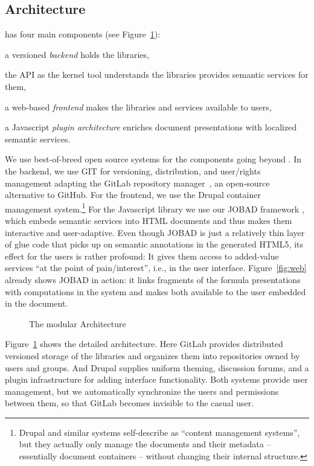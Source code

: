 \subsection{Architecture}\label{sec:mathhub:arch}
\mathhub has four main components (see Figure~\ref{fig:arch}):
\begin{compactenum}[\em i\rm)]
\item a versioned \emph{backend} holds the libraries,
\item the \mmt API as the kernel tool understands the libraries provides semantic services
  for them,
\item a web-based \emph{frontend} makes the libraries and services available to users,
\item a Javascript \emph{plugin architecture} enriches document presentations with
  localized semantic services.
\end{compactenum}
We use best-of-breed open source systems for the components going beyond \mmt.  In the
backend, we use GIT for versioning, distribution, and user/rights management adapting the
GitLab repository manager~\cite{GitLab:on}, an open-source alternative to GitHub. For the
frontend, we use the Drupal container management system.\footnote{Drupal and similar
  systems self-describe as ``content management systems'', but they actually only manage
  the documents and their metadata -- essentially document containers -- without changing
  their internal structure.} For the Javascript library we use our JOBAD framework
\cite{GLR:WebSvcActMathDoc09,Kohlhase:ppte12}, which embeds semantic services into HTML documents
and thus makes them interactive and user-adaptive.  Even though JOBAD is just a relatively
thin layer of glue code that picks up on semantic annotations in the generated HTML5, its
effect for the users is rather profound: It gives them access to added-value services ``at
the point of pain/interest'', i.e., in the user interface.  Figure~\ref{fig:web} already
shows JOBAD in action: it links fragments of the formula presentations with computations
in the \mmt system and makes both available to the user embedded in the document.

\begin{figure}[ht]\centering{}
  
  \caption{The modular \mathhub Architecture}\label{fig:arch}
\end{figure}
Figure~\ref{fig:arch} shows the detailed architecture.  Here GitLab provides distributed
versioned storage of the libraries and organizes them into repositories owned by users and
groups.  And Drupal supplies uniform theming, discussion forums, and a plugin
infrastructure for adding interface functionality.  Both systems provide user management,
but we automatically synchronize the users and permissions between them, so that GitLab
becomes invisible to the casual user.

